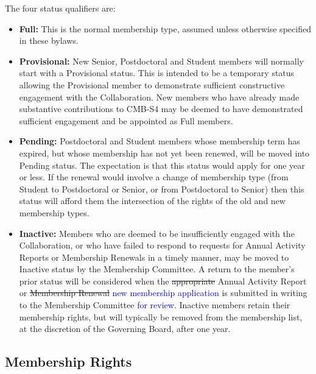 \documentclass[12pt]{article}
\begin{document}
\vspace*{0.1in}
\noindent
The four status qualifiers are:

\begin{itemize}

\item {\bf Full:}
This is the normal membership type, assumed unless otherwise specified in these bylaws.

\item {\bf Provisional:}
New Senior, Postdoctoral and Student members will normally start with a Provisional status. This is intended to be a temporary status allowing the Provisional member to demonstrate sufficient constructive engagement with the Collaboration. New members who have already made substantive contributions to CMB-S4 may be deemed to have demonstrated sufficient engagement and be appointed as Full members.

\item {\bf Pending:}
Postdoctoral and Student members whose membership term has expired, but whose membership has not yet been renewed, will be moved into Pending status.
The expectation is that this status would apply for one year or less.
If the renewal would involve a change of membership type (from Student to Postdoctoral or Senior, or from Postdoctoral to Senior) then this status will afford them the intersection of the rights of the old and new membership types.

\item {\bf Inactive:}
Members who are deemed to be insufficiently engaged with the Collaboration, or who have failed to respond to requests for Annual Activity Reports or Membership Renewals in a timely manner, may be moved to Inactive status by the Membership Committee. A return to the member's prior status will be considered when the \st{appropriate }Annual Activity Report or \st{Membership Renewal} \textcolor{blue}{new membership application} is submitted in writing to the Membership Committee \textcolor{blue}{for review}. Inactive members retain their membership rights, but will typically be removed from the membership list, at the discretion of the Governing Board, after one year.

\end{itemize}

\subsection{Membership Rights}\label{sec:memberrights}
\end{document}
